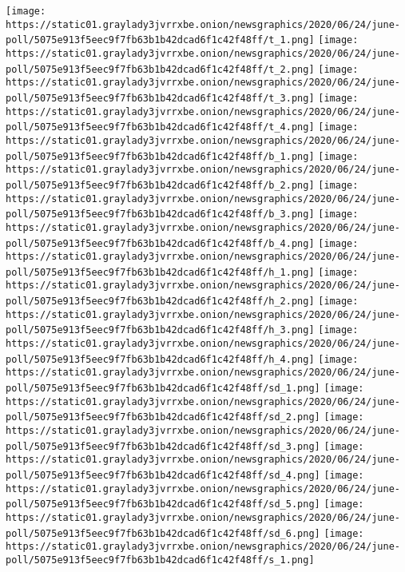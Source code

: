 \texttt{[image: https://static01.graylady3jvrrxbe.onion/newsgraphics/2020/06/24/june-poll/5075e913f5eec9f7fb63b1b42dcad6f1c42f48ff/t\_1.png]}
\texttt{[image: https://static01.graylady3jvrrxbe.onion/newsgraphics/2020/06/24/june-poll/5075e913f5eec9f7fb63b1b42dcad6f1c42f48ff/t\_2.png]}
\texttt{[image: https://static01.graylady3jvrrxbe.onion/newsgraphics/2020/06/24/june-poll/5075e913f5eec9f7fb63b1b42dcad6f1c42f48ff/t\_3.png]}
\texttt{[image: https://static01.graylady3jvrrxbe.onion/newsgraphics/2020/06/24/june-poll/5075e913f5eec9f7fb63b1b42dcad6f1c42f48ff/t\_4.png]}
\texttt{[image: https://static01.graylady3jvrrxbe.onion/newsgraphics/2020/06/24/june-poll/5075e913f5eec9f7fb63b1b42dcad6f1c42f48ff/b\_1.png]}
\texttt{[image: https://static01.graylady3jvrrxbe.onion/newsgraphics/2020/06/24/june-poll/5075e913f5eec9f7fb63b1b42dcad6f1c42f48ff/b\_2.png]}
\texttt{[image: https://static01.graylady3jvrrxbe.onion/newsgraphics/2020/06/24/june-poll/5075e913f5eec9f7fb63b1b42dcad6f1c42f48ff/b\_3.png]}
\texttt{[image: https://static01.graylady3jvrrxbe.onion/newsgraphics/2020/06/24/june-poll/5075e913f5eec9f7fb63b1b42dcad6f1c42f48ff/b\_4.png]}
\texttt{[image: https://static01.graylady3jvrrxbe.onion/newsgraphics/2020/06/24/june-poll/5075e913f5eec9f7fb63b1b42dcad6f1c42f48ff/h\_1.png]}
\texttt{[image: https://static01.graylady3jvrrxbe.onion/newsgraphics/2020/06/24/june-poll/5075e913f5eec9f7fb63b1b42dcad6f1c42f48ff/h\_2.png]}
\texttt{[image: https://static01.graylady3jvrrxbe.onion/newsgraphics/2020/06/24/june-poll/5075e913f5eec9f7fb63b1b42dcad6f1c42f48ff/h\_3.png]}
\texttt{[image: https://static01.graylady3jvrrxbe.onion/newsgraphics/2020/06/24/june-poll/5075e913f5eec9f7fb63b1b42dcad6f1c42f48ff/h\_4.png]}
\texttt{[image: https://static01.graylady3jvrrxbe.onion/newsgraphics/2020/06/24/june-poll/5075e913f5eec9f7fb63b1b42dcad6f1c42f48ff/sd\_1.png]}
\texttt{[image: https://static01.graylady3jvrrxbe.onion/newsgraphics/2020/06/24/june-poll/5075e913f5eec9f7fb63b1b42dcad6f1c42f48ff/sd\_2.png]}
\texttt{[image: https://static01.graylady3jvrrxbe.onion/newsgraphics/2020/06/24/june-poll/5075e913f5eec9f7fb63b1b42dcad6f1c42f48ff/sd\_3.png]}
\texttt{[image: https://static01.graylady3jvrrxbe.onion/newsgraphics/2020/06/24/june-poll/5075e913f5eec9f7fb63b1b42dcad6f1c42f48ff/sd\_4.png]}
\texttt{[image: https://static01.graylady3jvrrxbe.onion/newsgraphics/2020/06/24/june-poll/5075e913f5eec9f7fb63b1b42dcad6f1c42f48ff/sd\_5.png]}
\texttt{[image: https://static01.graylady3jvrrxbe.onion/newsgraphics/2020/06/24/june-poll/5075e913f5eec9f7fb63b1b42dcad6f1c42f48ff/sd\_6.png]}
\texttt{[image: https://static01.graylady3jvrrxbe.onion/newsgraphics/2020/06/24/june-poll/5075e913f5eec9f7fb63b1b42dcad6f1c42f48ff/s\_1.png]}
